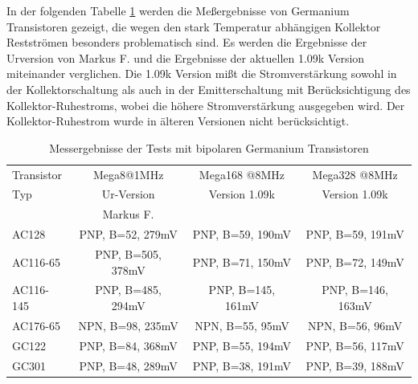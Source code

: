 In der folgenden Tabelle \ref{tab:germanium} werden die Meßergebnisse von Germanium Transistoren gezeigt, die wegen den
stark Temperatur abhängigen Kollektor Restströmen besonders problematisch sind.
Es werden die Ergebnisse der Urversion von Markus F. und die Ergebnisse der aktuellen 1.09k Version
miteinander verglichen. Die 1.09k Version mißt die Stromverstärkung sowohl in der
Kollektorschaltung als auch in der Emitterschaltung mit Berücksichtigung des Kollektor-Ruhestroms,
 wobei die höhere Stromverstärkung ausgegeben wird. Der Kollektor-Ruhestrom wurde in älteren Versionen
nicht berücksichtigt.

\begin{table}[H]
  \begin{center}
    \begin{tabular}{| l | c | c | c |}
    \hline
 Transistor & Mega8@1MHz          & Mega168 @8MHz       & Mega328 @8MHz    \\
    Typ     & Ur-Version          & Version 1.09k       & Version 1.09k  \\
            & Markus F.           &                     &        \\
    \hline
    \hline
AC128       & PNP, B=52, 279mV    & PNP, B=59, 190mV    & PNP, B=59, 191mV    \\
    \hline
AC116-65    & PNP, B=505, 378mV   & PNP, B=71, 150mV    & PNP, B=72, 149mV    \\
    \hline
AC116-145   & PNP, B=485, 294mV   & PNP, B=145, 161mV    & PNP, B=146, 163mV   \\
    \hline
AC176-65    & NPN, B=98, 235mV    & NPN, B=55, 95mV    & NPN, B=56, 96mV     \\
    \hline
GC122       & PNP, B=84, 368mV    & PNP, B=55, 194mV    & PNP, B=56, 117mV    \\
    \hline
GC301       & PNP, B=48, 289mV    & PNP, B=38, 191mV    & PNP, B=39, 188mV    \\
    \hline
    \end{tabular}
  \end{center}
  \caption{Messergebnisse der Tests mit bipolaren Germanium Transistoren}
  \label{tab:germanium} 
\end{table}

